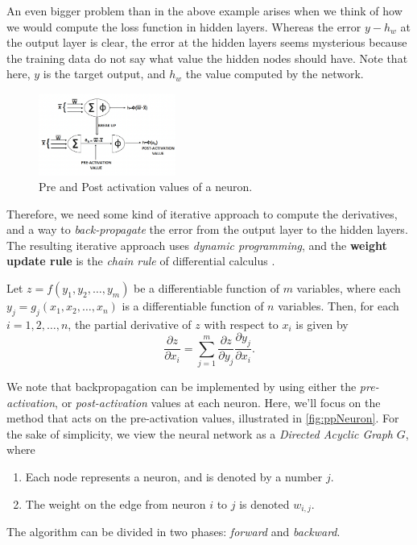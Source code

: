 \documentclass{article}
\begin{document}
 An even bigger problem than in the above example arises when we think of how we would compute the loss function in hidden layers. Whereas the error $y -h_w$ at the output layer is clear, the error at the hidden layers seems mysterious because the training data do not say what value the hidden nodes should have. Note that here, $y$ is the target output, and $h_w$ the value computed by the network.
\begin{figure} %
    \centering
    \includegraphics[width=0.4\textwidth]{pre-post-neuron}
    \caption{Pre and Post activation values of a neuron.}
    \label{fig:ppNeuron}
\end{figure}

  Therefore, we need some kind of iterative approach to compute the derivatives, and a way to \textit{back-propagate} the error from the output layer to the hidden layers. The resulting iterative approach uses \textit{dynamic programming}, and the \textbf{weight update rule} is the \textit{chain rule} of differential calculus \citep{inbook:Aggarwal-3.2}.

\begin{theorem} \label{chain}
    Let $z = f(y_1, y_2, \ldots, y_m)$ be a differentiable function of $m$ variables, where each $y_j = g_j(x_1, x_2, \ldots, x_n)$ is a differentiable function of $n$ variables. Then, for each $i = 1, 2, \ldots, n$, the partial derivative of $z$ with respect to $x_i$ is given by
$$
\frac{\partial z}{\partial x_i} = \sum_{j=1}^{m} \frac{\partial z}{\partial y_j} \frac{\partial y_j}{\partial x_i}.$$
  \end{theorem}
  We note that backpropagation can be implemented by using either the \textit{pre-activation}, or \textit{post-activation} values at each neuron. Here, we'll focus on the method that acts on the pre-activation values, illustrated in \autoref{fig:ppNeuron}. For the sake of simplicity, we view the neural network as a \textit{Directed Acyclic Graph} $G$, where 
  \begin{enumerate}
    \item Each node represents a neuron, and is denoted by a number $j$.
    \item The weight on the edge from neuron $i$ to $j$ is denoted $w_{i,j}$.
  \end{enumerate}
  The algorithm can be divided in two phases: \textit{forward} and \textit{backward}.
\end{document}
